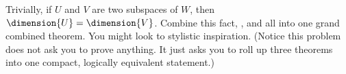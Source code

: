 Trivially, if $U$ and $V$ are two subspaces of $W$, then $\dimension{U}=\dimension{V}$.  Combine this fact, , and  all into one grand combined theorem.  You might look to  stylistic inspiration.  (Notice this problem does not ask you to prove anything.  It just asks you to roll up three theorems into one compact, logically equivalent statement.)